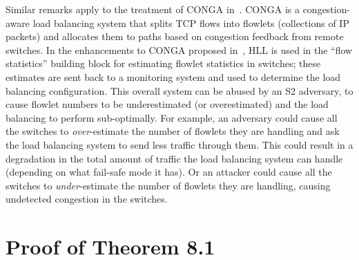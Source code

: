 \documentclass[sigconf, anonymous, dvipsnames]{acmart} %
\begin{document}
Similar remarks apply to the treatment of CONGA in~\cite[Section 4.5]{flexswitch}. CONGA is a congestion-aware load balancing system that splits TCP flows into flowlets (collections of IP packets) and allocates them to paths based on congestion feedback from remote switches. In the enhancements to CONGA proposed in~\cite{flexswitch}, HLL is used in the ``flow statistics'' building block for estimating flowlet statistics in switches; these estimates are sent back to a monitoring system and used to determine the load balancing configuration. This overall system can be abused by an S2 adversary, to cause flowlet numbers to be underestimated (or overestimated) and the load balancing to perform sub-optimally. For example, an adversary could cause all the switches to \emph{over}-estimate the number of flowlets they are handling and ask the load balancing system to send less traffic through them. This could result in a degradation in the total amount of traffic the load balancing system can handle (depending on what fail-safe mode it has). Or an attacker could cause all the switches to \emph{under}-estimate the number of flowlets they are handling, causing undetected congestion in the switches.

\section{Proof of Theorem 8.1}\label{sec:proof} %
\end{document}
